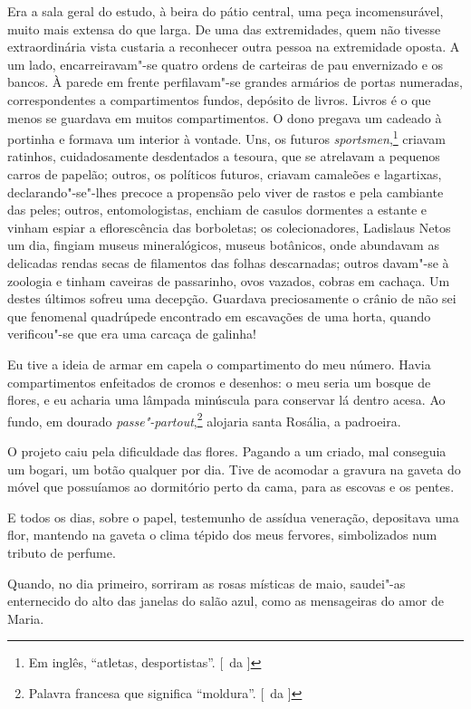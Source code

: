 Era a sala geral do estudo, à beira do pátio central, uma peça
incomensurável, muito mais extensa do que larga. De uma das
extremidades, quem não tivesse extraordinária vista custaria a
reconhecer outra pessoa na extremidade oposta. A um lado,
encarreiravam"-se quatro ordens de carteiras de pau envernizado e os
bancos. À parede em frente perfilavam"-se grandes armários de portas
numeradas, correspondentes a compartimentos fundos, depósito de livros.
Livros é o que menos se guardava em muitos compartimentos. O dono
pregava um cadeado à portinha e formava um interior à vontade. Uns, os
futuros \textit{sportsmen},\footnote{ Em inglês, ``atletas, desportistas''. 
[~da ]} criavam ratinhos, cuidadosamente desdentados a
tesoura, que se atrelavam a pequenos carros de papelão; outros, os
políticos futuros, criavam camaleões e lagartixas,
declarando"-se"-lhes precoce a propensão pelo viver de rastos e pela
cambiante das peles; outros, entomologistas, enchiam de casulos
dormentes a estante e vinham espiar a eflorescência das borboletas; os
colecionadores, Ladislaus Netos um dia, fingiam museus mineralógicos,
museus botânicos, onde abundavam as delicadas rendas secas de
filamentos das folhas descarnadas; outros davam"-se à zoologia e
tinham caveiras de passarinho, ovos vazados, cobras em cachaça. Um
destes últimos sofreu uma decepção. Guardava preciosamente o crânio de
não sei que fenomenal quadrúpede encontrado em escavações de uma horta,
quando verificou"-se que era uma carcaça de galinha! 

Eu tive a ideia
de armar em capela o compartimento do meu número. Havia compartimentos
enfeitados de cromos e desenhos: o meu seria um bosque de flores, e eu
acharia uma lâmpada minúscula para conservar lá dentro acesa. Ao fundo,
em dourado \textit{passe"-partout},\footnote{ Palavra francesa que significa 
``moldura''. [~da ]} alojaria santa Rosália, a padroeira. 


O projeto caiu pela dificuldade das flores. Pagando a um criado, mal
conseguia um bogari, um botão qualquer por dia. Tive de acomodar a
gravura na gaveta do móvel que possuíamos ao dormitório perto da cama,
para as escovas e os pentes. 


E todos os dias, sobre o papel, testemunho
de assídua veneração, depositava uma flor, mantendo na gaveta o clima
tépido dos meus fervores, simbolizados num tributo de perfume. 

Quando, no dia primeiro, sorriram as rosas místicas de maio, saudei"-as
enternecido do alto das janelas do salão azul, como as mensageiras do
amor de Maria. 

